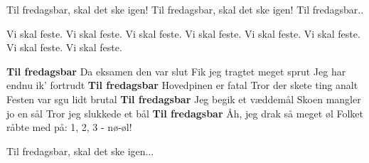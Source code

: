 \documentclass[a4paper,11pt]{article}
\begin{document}
\begin{song}
Til fredagsbar, skal det ske igen!
Til fredagsbar, skal det ske igen!
Til fredagsbar..

Vi skal feste.
Vi skal feste.
Vi skal feste.
Vi skal feste.
Vi skal feste.
Vi skal feste.
Vi skal feste.
Vi skal feste.


\textbf{Til fredagsbar}
Da eksamen den var slut
Fik jeg tragtet meget sprut
Jeg har endnu ik' fortrudt
\textbf{Til fredagsbar}
Hovedpinen er fatal
Tror der skete ting analt
Festen var sgu lidt brutal
\textbf{Til fredagsbar}
Jeg begik et væddemål
Skoen mangler jo en sål
Tror jeg slukkede et bål
\textbf{Til fredagsbar}
Åh, jeg drak så meget øl
Folket råbte med på: 1, 2, 3 - nø-øl!

Til fredagsbar, skal det ske igen...
  \end{song}
\end{document}
